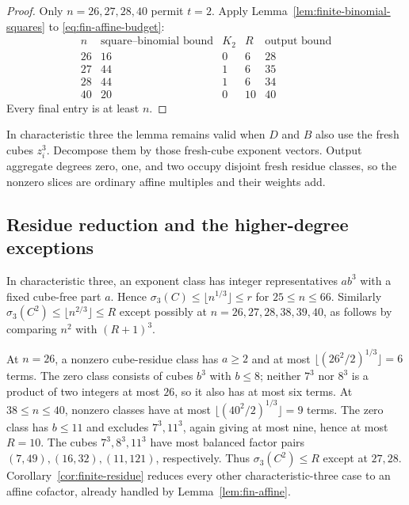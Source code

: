 \documentclass[11pt]{article}
\numberwithin{equation}{section}
\theoremstyle{definition}\newtheorem{definition}[theorem]{Definition}
\theoremstyle{remark}\newtheorem{remark}[theorem]{Remark}
\begin{document}
\begin{proof}
Only $n=26,27,28,40$ permit $t=2$. Apply
Lemma~\ref{lem:finite-binomial-squares} to
\eqref{eq:fin-affine-budget}:
\[
\begin{array}{r|rrrr}
n&\text{square--binomial bound}&K_2&R&\text{output bound}\\\hline
26&16&0&6&28\\
27&44&1&6&35\\
28&44&1&6&34\\
40&20&0&10&40
\end{array}
\]
Every final entry is at least $n$.
\end{proof}

In characteristic three the lemma remains valid when $D$ and $B$ also
use the fresh cubes $z_i^3$. Decompose them by those fresh-cube exponent
vectors. Output aggregate degrees zero, one, and two occupy disjoint
fresh residue classes, so the nonzero slices are ordinary affine
multiples and their weights add.

\subsection{Residue reduction and the higher-degree exceptions}

In characteristic three, an exponent class has integer representatives
$ab^3$ with a fixed cube-free part $a$. Hence
$\sigma_3(C)\le\lfloor n^{1/3}\rfloor\le r$ for $25\le n\le66$.
Similarly $\sigma_3(C^2)\le\lfloor n^{2/3}\rfloor\le R$ except
possibly at $n=26,27,28,38,39,40$, as follows by comparing
$n^2$ with $(R+1)^3$.

At $n=26$, a nonzero cube-residue class has $a\ge2$ and at most
$\lfloor(26^2/2)^{1/3}\rfloor=6$ terms. The zero class consists of
cubes $b^3$ with $b\le8$; neither $7^3$ nor $8^3$ is a product of
two integers at most $26$, so it also has at most six terms.
At $38\le n\le40$, nonzero classes have at most
$\lfloor(40^2/2)^{1/3}\rfloor=9$ terms. The zero class has $b\le11$
and excludes $7^3,11^3$, again giving at most nine, hence at most
$R=10$. The cubes $7^3,8^3,11^3$ have most balanced factor pairs
$(7,49),(16,32),(11,121)$, respectively.
Thus $\sigma_3(C^2)\le R$ except at $27,28$.
Corollary~\ref{cor:finite-residue} reduces every other
characteristic-three case to an affine cofactor, already handled
by Lemma~\ref{lem:fin-affine}.
\end{document}

